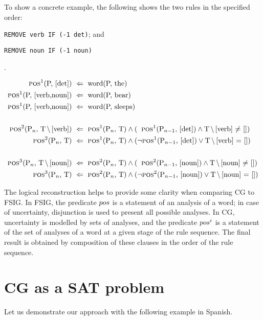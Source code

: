 To show a concrete example, the following shows the two rules in the specified order:
\begin{inparaenum}
\def\labelenumi{\arabic{enumi}.}
\itemsep1pt\parskip0pt
\item \texttt{REMOVE verb IF (-1 det)}; and
\item  \texttt{REMOVE noun IF (-1 noun)}
\end{inparaenum}.

\begin{align*}
\text{{\sc pos}$^1$(P, [det])} \  &\Leftarrow \  \text{word(P, the)} \\
\text{{\sc pos}$^1$(P, [verb,noun])} \ &\Leftarrow \ \text{word(P, bear)} \\
\text{{\sc pos}$^1$(P, [verb,noun])} \ &\Leftarrow \ \text{word(P, sleeps)} \\ \\
\text{{\sc pos}$^2$(P$_n$, T$\,\setminus\,$[verb])} \ &\Leftarrow \ \text{{\sc pos}$^1$(P$_n$, T)}
 \wedge (\;\; \text{{\sc pos}$^1$(P$_{n-1}$, [det])}  \wedge  \text{T$\,\setminus\,$[verb] $\neq$ []}) \\
\text{{\sc pos}$^2$(P$_n$, T)} \ &\Leftarrow \  \text{{\sc pos}$^1$(P$_n$, T)} \wedge
(\neg \text{{\sc pos}$^1$(P$_{n-1}$, [det])} \vee \text{T$\,\setminus\,$[verb]
  $=$ []}) \\ \\
\text{{\sc pos}$^3$(P$_n$, T$\,\setminus\,$[noun])} \ &\Leftarrow \ \text{{\sc pos}$^2$(P$_n$, T)}
 \wedge (\;\; \text{{\sc pos}$^2$(P$_{n-1}$, [noun])}  \wedge  \text{T$\,\setminus\,$[noun] $\neq$ []}) \\
\text{{\sc pos}$^3$(P$_n$, T)} \ &\Leftarrow \  \text{{\sc pos}$^2$(P$_n$, T)} \wedge
(\neg \text{{\sc pos}$^2$(P$_{n-1}$, [noun])} \vee \text{T$\,\setminus\,$[noun]
  $=$ []})
\end{align*}

The logical reconstruction helps to provide some clarity when comparing CG
to FSIG. In FSIG, the predicate ${\sc pos}$ is a statement of an analysis of a
word; in case of uncertainty, disjunction is used to present all possible analyses. In CG, uncertainty is modelled by sets of analyses,
and the predicate ${\sc pos}^i$ is a statement of the
set of analyses of a word at a given stage of the rule sequence. The
final result is obtained by composition of these clauses in the order of
the rule sequence.



\section{CG as a SAT problem}
Let us demonstrate our approach with the following example in Spanish.

